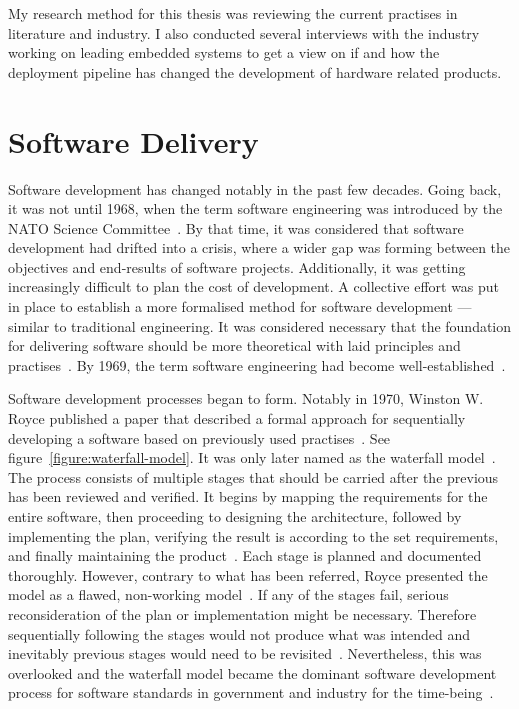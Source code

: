 \documentclass[english]{tktltiki2}
\begin{document}
My research method for this thesis was reviewing the current practises in literature and industry. I also conducted several interviews with the industry working on leading embedded systems to get a view on if and how the deployment pipeline has changed the development of hardware related products.


\section{Software Delivery}

Software development has changed notably in the past few decades. Going back, it was not until 1968, when the term software engineering was introduced by the NATO Science Committee~\cite{NR69}. By that time, it was considered that software development had drifted into a crisis, where a wider gap was forming between the objectives and end-results of software projects. Additionally, it was getting increasingly difficult to plan the cost of development. A collective effort was put in place to establish a more formalised method for software development — similar to traditional engineering. It was considered necessary that the foundation for delivering software should be more theoretical with laid principles and practises~\cite{NR69}. By 1969, the term software engineering had become well-established~\cite{BR70}.

Software development processes began to form. Notably in 1970, Winston W. Royce published a paper that described a formal approach for sequentially developing a software based on previously used practises~\cite{Roy70}. See figure~\ref{figure:waterfall-model}. It was only later named as the waterfall model~\cite{Boe88, LB03}. The process consists of multiple stages that should be carried after the previous has been reviewed and verified. It begins by mapping the requirements for the entire software, then proceeding to designing the architecture, followed by implementing the plan, verifying the result is according to the set requirements, and finally maintaining the product~\cite{Roy70}. Each stage is planned and documented thoroughly. However, contrary to what has been referred, Royce presented the model as a flawed, non-working model~\cite{Roy70}. If any of the stages fail, serious reconsideration of the plan or implementation might be necessary. Therefore sequentially following the stages would not produce what was intended and inevitably previous stages would need to be revisited~\cite{Roy70}. Nevertheless, this was overlooked and the waterfall model became the dominant software development process for software standards in government and industry for the time-being~\cite{Boe88, LB03}.
\end{document}
